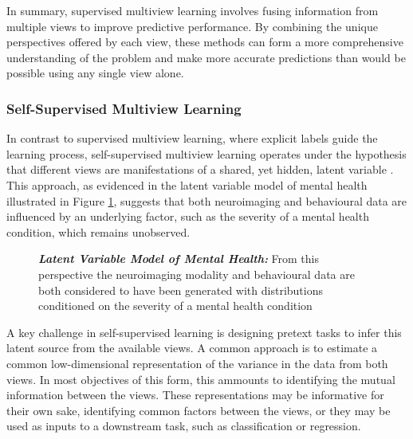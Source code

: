 In summary, supervised multiview learning involves fusing information from multiple views to improve predictive performance. By combining the unique perspectives offered by each view, these methods can form a more comprehensive understanding of the problem and make more accurate predictions than would be possible using any single view alone.

\subsubsection{Self-Supervised Multiview Learning}

In contrast to supervised multiview learning, where explicit labels guide the learning process, self-supervised multiview learning operates under the hypothesis that different views are manifestations of a shared, yet hidden, latent variable \citep{zong2023self}.
This approach, as evidenced in the latent variable model of mental health illustrated in Figure \ref{fig:mentalhealthselfsupervised}, suggests that both neuroimaging and behavioural data are influenced by an underlying factor, such as the severity of a mental health condition, which remains unobserved.

\begin{figure}
    \centering
    \caption[Latent Variable Model of Mental Health]{\textit{\textbf{Latent Variable Model of Mental Health:}} From this perspective the neuroimaging modality and behavioural data are both considered to have been generated with distributions conditioned on the severity of a mental health condition}\label{fig:mentalhealthselfsupervised}
\end{figure}

A key challenge in self-supervised learning is designing pretext tasks to infer this latent source from the available views.
A common approach is to estimate a common low-dimensional representation of the variance in the data from both \gls{views}.
In most objectives of this form, this ammounts to identifying the mutual information between the \gls{views}.
These representations may be informative for their own sake, identifying common factors between the \gls{views}, or they may be used as inputs to a downstream task, such as classification or regression.

